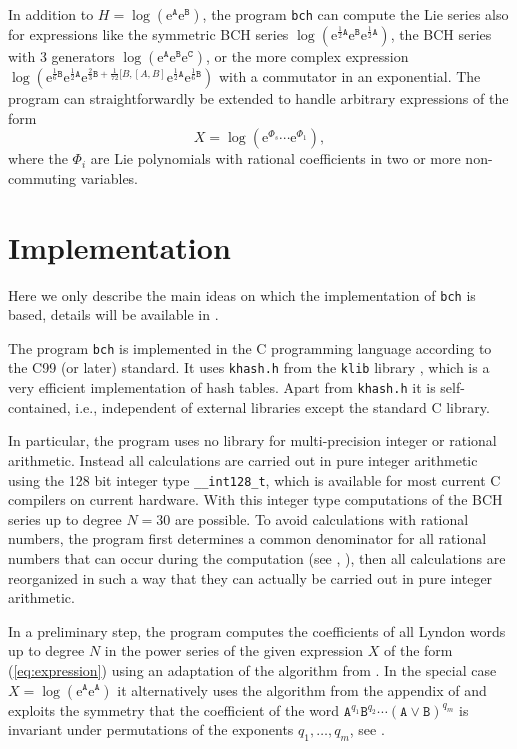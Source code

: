 \documentclass[11pt,a4paper]{article}
\newcommand{\ee}{\mathrm{e}}
\renewcommand{\AA}{\mathtt{A}}
\newcommand{\BB}{\mathtt{B}}
\newcommand{\CC}{\mathtt{C}}
\begin{document}
In addition to $H=\log(\ee^\AA\ee^\BB)$, the program  \verb|bch| can  compute  the Lie series  also for expressions
like the symmetric BCH series
$\log(\ee^{\frac{1}{2}\AA}\ee^\BB\ee^{\frac{1}{2}\AA})$,
the BCH series with 3 generators
$\log(\ee^\AA\ee^\BB\ee^\CC)$,
or the more complex expression 
$\log(\ee^{\frac{1}{6}\BB}\ee^{\frac{1}{2}\AA}
\ee^{\frac{2}{3}\BB+\frac{1}{72}[B,[A,B]}\ee^{\frac{1}{2}\AA}\ee^{\frac{1}{6}\BB})$
with a commutator in an exponential.
The program can straightforwardly be extended to handle arbitrary expressions of
the form
\begin{equation}\label{eq:expression}
X = \log(\ee^{\Phi_s}\cdots\ee^{\Phi_1}),
\end{equation}
 where the $\Phi_i$ are Lie polynomials
with rational coefficients in two or more non-commuting variables.




\section{Implementation}\label{Sec:Imnplementation}
Here we only describe the main ideas on which the implementation of \verb|bch| is based, details will be available in \cite{HHfast}.

The program \verb|bch| is implemented in the  C programming language according to the
C99 (or later) standard. It uses  \verb|khash.h| from the \verb|klib| library \cite{klib}, which is a very efficient implementation of hash tables.
Apart from \verb|khash.h| it is self-contained, i.e., independent of external libraries except the standard C library. 

In particular, the program  uses no library for multi-precision integer or rational arithmetic.
Instead all calculations are carried out in  pure integer arithmetic using the 
128 bit integer type \verb|__int128_t|, which is available for most current C compilers on 
current hardware. With  this integer type computations of the BCH series up to degree
$N=30$ are possible.
To avoid calculations with rational numbers,
the program first determines a common denominator for all rational numbers that can 
occur during the computation (see \cite{HHdenom}, \cite{HHSmallestDenom}), 
then all calculations are reorganized in such a way
that they can actually be carried out in pure integer arithmetic.


In a  preliminary step,
the program  computes the coefficients of all Lyndon words up to degree 
$N$ 
 in the power series of the given expression $X$ of the form (\ref{eq:expression})
using an adaptation of the algorithm from \cite{HHetalWordAlg}. In the special
case $X=\log(\ee^\AA\ee^\AA)$ it alternatively uses the algorithm from 
the appendix of \cite{HHSmallestDenom} and exploits the symmetry that
the coefficient of the word $\AA^{q_1}\BB^{q_2}\cdots(\AA\lor\BB)^{q_m}$ is
invariant under permutations of the exponents $q_1,\dots,q_m$, see \cite{G}.
\end{document}
